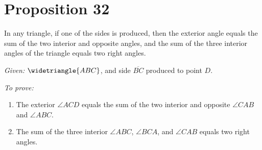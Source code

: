 
\section*{Proposition 32}

\begin{thm}
In any triangle, if one of the sides is produced, then the exterior angle equals the sum of the two interior and opposite angles, and the sum of the three interior angles of the triangle equals two right angles.
\end{thm}

\textit{Given:} $\widetriangle{ABC}$, and side $\overline{BC}$ produced to point $D$.

\begin{figure}[H]
	\caption{}
\end{figure}

\textit{To prove:}
\begin{enumerate}
    \item The exterior $\angle{ACD}$ equals the sum of the two interior and opposite $\angle{CAB}$ and $\angle{ABC}$.
    \item The sum of the three interior $\angle{ABC}$, $\angle{BCA}$, and $\angle{CAB}$ equals two right angles.
\end{enumerate}

